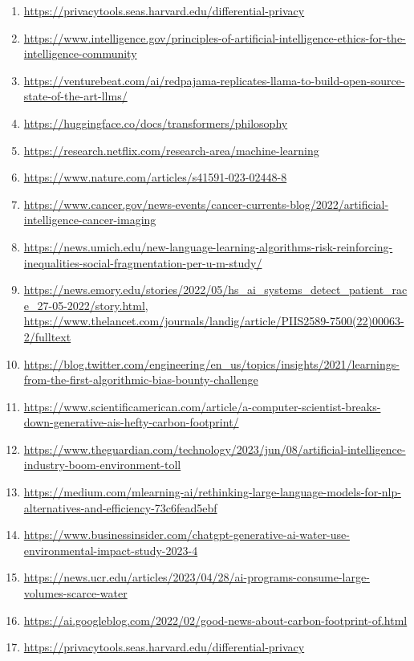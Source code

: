 \documentclass[
]{book}
\providecommand{\tightlist}{%
  \setlength{\itemsep}{0pt}\setlength{\parskip}{0pt}}
\begin{document}
\begin{enumerate}
\def\labelenumi{\arabic{enumi}.}
\tightlist
\item
  \url{https://privacytools.seas.harvard.edu/differential-privacy}
\item
  \url{https://www.intelligence.gov/principles-of-artificial-intelligence-ethics-for-the-intelligence-community}
\item
  \url{https://venturebeat.com/ai/redpajama-replicates-llama-to-build-open-source-state-of-the-art-llms/}
\item
  \url{https://huggingface.co/docs/transformers/philosophy}
\item
  \url{https://research.netflix.com/research-area/machine-learning}
\item
  \url{https://www.nature.com/articles/s41591-023-02448-8}
\item
  \url{https://www.cancer.gov/news-events/cancer-currents-blog/2022/artificial-intelligence-cancer-imaging}
\item
  \url{https://news.umich.edu/new-language-learning-algorithms-risk-reinforcing-inequalities-social-fragmentation-per-u-m-study/}
\item
  \url{https://news.emory.edu/stories/2022/05/hs_ai_systems_detect_patient_race_27-05-2022/story.html}, \url{https://www.thelancet.com/journals/landig/article/PIIS2589-7500(22)00063-2/fulltext}
\item
  \url{https://blog.twitter.com/engineering/en_us/topics/insights/2021/learnings-from-the-first-algorithmic-bias-bounty-challenge}
\item
  \url{https://www.scientificamerican.com/article/a-computer-scientist-breaks-down-generative-ais-hefty-carbon-footprint/}
\item
  \url{https://www.theguardian.com/technology/2023/jun/08/artificial-intelligence-industry-boom-environment-toll}
\item
  \url{https://medium.com/mlearning-ai/rethinking-large-language-models-for-nlp-alternatives-and-efficiency-73c6fead5ebf}
\item
  \url{https://www.businessinsider.com/chatgpt-generative-ai-water-use-environmental-impact-study-2023-4}
\item
  \url{https://news.ucr.edu/articles/2023/04/28/ai-programs-consume-large-volumes-scarce-water}
\item
  \url{https://ai.googleblog.com/2022/02/good-news-about-carbon-footprint-of.html}
\item
  \url{https://privacytools.seas.harvard.edu/differential-privacy}

\end{enumerate}
\end{document}
